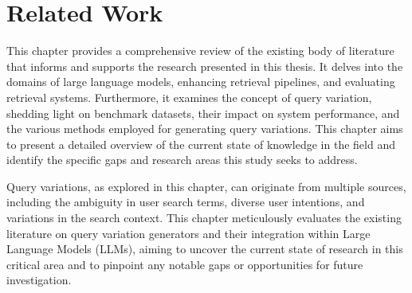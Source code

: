 \chapter{Related Work}
This chapter provides a comprehensive review of the existing body of literature that informs and supports the research presented in this thesis. It delves into the domains of large language models, enhancing retrieval pipelines, and evaluating retrieval systems. Furthermore, it examines the concept of query variation, shedding light on benchmark datasets, their impact on system performance, and the various methods employed for generating query variations. This chapter aims to present a detailed overview of the current state of knowledge in the field and identify the specific gaps and research areas this study seeks to address.

Query variations, as explored in this chapter, can originate from multiple sources, including the ambiguity in user search terms, diverse user intentions, and variations in the search context. This chapter meticulously evaluates the existing literature on query variation generators and their integration within Large Language Models (LLMs), aiming to uncover the current state of research in this critical area and to pinpoint any notable gaps or opportunities for future investigation.



